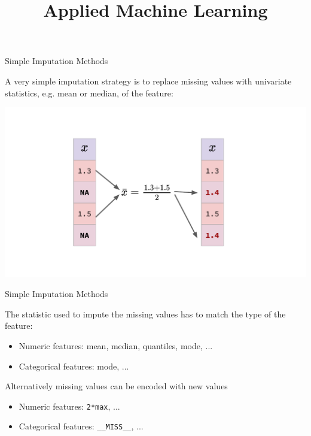 \documentclass[11pt,compress,t,notes=noshow, xcolor=table]{beamer}
\title{Applied Machine Learning}
\date{}
\begin{document}
 


\begin{frame}{Simple Imputation Methods}

    A very simple imputation strategy is to replace missing values with univariate statistics, e.g. mean or median, of the feature:
    
    \begin{center}
        \includegraphics[width=\textwidth]{figure_man/fe_imputation_simple.pdf}
    \end{center}

\end{frame}

\begin{frame}{Simple Imputation Methods}

    The statistic used to impute the missing values has to match the type of the feature:
    
    \begin{itemize}
        \item Numeric features: mean, median, quantiles, mode, ...
        \item Categorical features: mode, ...
    \end{itemize}
    
    Alternatively missing values can be encoded with new values
    
    \begin{itemize}
        \item Numeric features: \texttt{2*max}, ...
        \item Categorical features: \texttt{\_\_MISS\_\_}, ...
    \end{itemize}

\end{frame}
\end{document}
